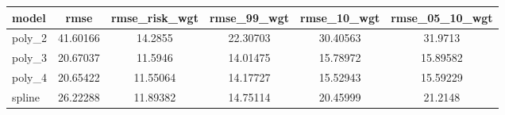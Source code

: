 \documentclass[]{article}
\begin{document}
\begin{tabular}{lccccc} \hline
model & rmse & rmse\_risk\_wgt & rmse\_99\_wgt & rmse\_10\_wgt & rmse\_05\_10\_wgt \\ \hline
poly\_2 & 41.60166 & 14.2855 & 22.30703 & 30.40563 & 31.9713 \\
poly\_3 & 20.67037 & 11.5946 & 14.01475 & 15.78972 & 15.89582 \\
poly\_4 & 20.65422 & 11.55064 & 14.17727 & 15.52943 & 15.59229 \\
 spline & 26.22288 & 11.89382 & 14.75114 & 20.45999 & 21.2148 \\ \hline
\end{tabular}
\end{document}
